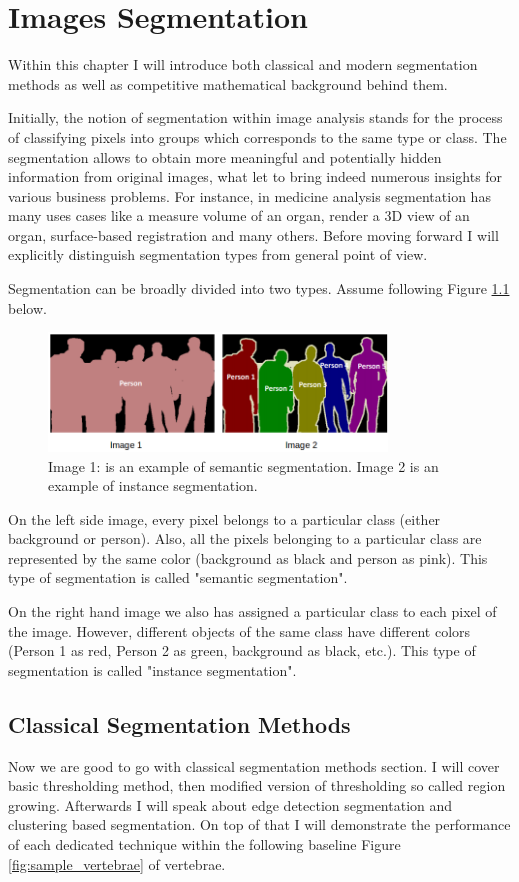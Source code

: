 \chapter{Images Segmentation}
\label{ch:image_segmentation}
Within this chapter I will introduce both classical and modern segmentation methods as well as competitive mathematical background behind them.

Initially, the notion of segmentation within image analysis stands for the process of classifying pixels into groups which corresponds to the same type or class. The segmentation allows to obtain more meaningful and potentially hidden information from original images, what let to bring indeed numerous insights for various business problems. For instance, in medicine analysis segmentation has many uses cases like a measure volume of an organ, render a 3D view of an organ, surface-based registration and many others. Before moving forward I will explicitly distinguish segmentation types from general point of view.

Segmentation can be broadly divided into two types. Assume following Figure \ref{fig:image_segmentation} below. 
\begin{figure}[h]
    \centering
    \includegraphics[width=9cm]{images/segmentation_types.png}
    \caption{Image 1: is an example of semantic segmentation. Image 2 is an example of instance segmentation.}
    \label{fig:image_segmentation}
\end{figure}

On the left side image, every pixel belongs to a particular class (either background or person). Also, all the pixels belonging to a particular class are represented by the same color (background as black and person as pink). This type of segmentation is called "semantic segmentation".  

On the right hand image we also has assigned a particular class to each pixel of the image. However, different objects of the same class have different colors (Person 1 as red, Person 2 as green, background as black, etc.). This type of segmentation is called "instance segmentation".

\section{Classical Segmentation Methods} 
Now we are good to go with classical segmentation methods section. I will cover basic thresholding method, then modified version of thresholding so called region growing. Afterwards I will speak about edge detection segmentation and clustering based segmentation. On top of that I will demonstrate the performance of each dedicated technique within the following baseline Figure \ref{fig:sample_vertebrae} of vertebrae.

